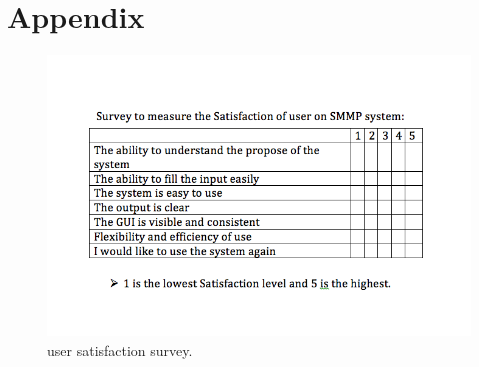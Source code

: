 \documentclass[12pt, titlepage]{article}
\begin{document}
\newpage




\newpage

\section{Appendix}
 \begin{figure}[h!]
 \begin{center}
 \includegraphics [width=\textwidth]{survey}
 \caption{\label{ Figure 1:} user satisfaction survey.}
 \end{center}
 \end{figure}
\end{document}
